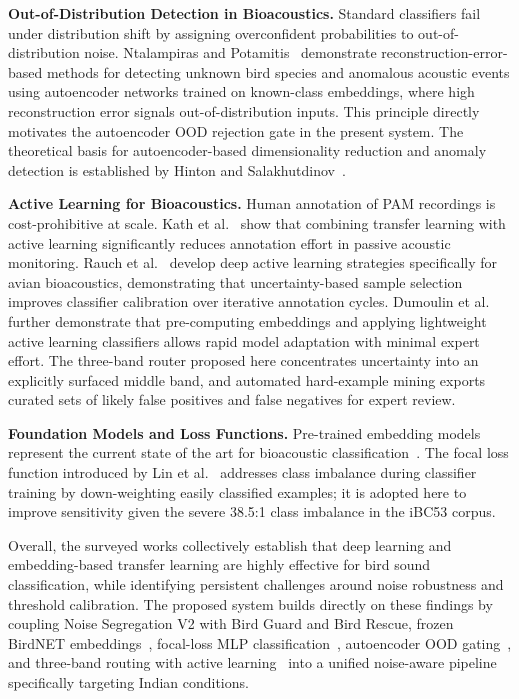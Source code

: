 \documentclass[a4paper,12pt]{article}
\begin{document}
\vspace{0.3cm}

\noindent
\textbf{Out-of-Distribution Detection in Bioacoustics.}
Standard classifiers fail under distribution shift by assigning overconfident probabilities to
out-of-distribution noise. Ntalampiras and Potamitis~\cite{Ntalampiras} demonstrate
reconstruction-error-based methods for detecting unknown bird species and anomalous acoustic
events using autoencoder networks trained on known-class embeddings, where high reconstruction
error signals out-of-distribution inputs. This principle directly motivates the autoencoder OOD
rejection gate in the present system. The theoretical basis for autoencoder-based dimensionality
reduction and anomaly detection is established by Hinton and Salakhutdinov~\cite{Hinton}.

\vspace{0.3cm}

\noindent
\textbf{Active Learning for Bioacoustics.}
Human annotation of PAM recordings is cost-prohibitive at scale. Kath et al.\ \cite{Kath} show
that combining transfer learning with active learning significantly reduces annotation effort in
passive acoustic monitoring. Rauch et al.\ \cite{Rauch} develop deep active learning strategies
specifically for avian bioacoustics, demonstrating that uncertainty-based sample selection improves
classifier calibration over iterative annotation cycles. Dumoulin et al.\ \cite{Dumoulin} further
demonstrate that pre-computing embeddings and applying lightweight active learning classifiers
allows rapid model adaptation with minimal expert effort. The three-band router proposed here
concentrates uncertainty into an explicitly surfaced middle band, and automated hard-example
mining exports curated sets of likely false positives and false negatives for expert review.

\vspace{0.3cm}

\noindent
\textbf{Foundation Models and Loss Functions.}
Pre-trained embedding models represent the current state of the art for bioacoustic
classification~\cite{Stowell,Ghani}. The focal loss function introduced by Lin et al.\ \cite{FocalLoss}
addresses class imbalance during classifier training by down-weighting easily classified examples;
it is adopted here to improve sensitivity given the severe 38.5:1 class imbalance in the iBC53
corpus.

\vspace{0.3cm}

\noindent
Overall, the surveyed works collectively establish that deep learning and embedding-based transfer
learning are highly effective for bird sound classification, while identifying persistent challenges
around noise robustness and threshold calibration. The proposed system builds directly on these
findings by coupling Noise Segregation V2 with Bird Guard and Bird Rescue, frozen BirdNET
embeddings~\cite{BirdNET}, focal-loss MLP classification~\cite{FocalLoss}, autoencoder OOD
gating~\cite{Ntalampiras,Hinton}, and three-band routing with active learning~\cite{Kath,Rauch}
into a unified noise-aware pipeline specifically targeting Indian conditions.
\end{document}

